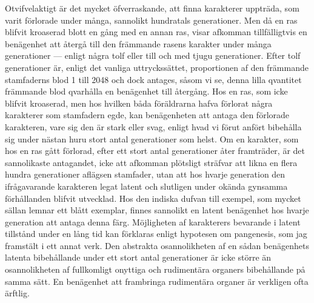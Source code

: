 Otvifvelaktigt är det mycket öfverraskande, att finna karakterer uppträda, som varit förlorade under många, sannolikt hundratals generationer. Men då en ras blifvit kroaserad blott en gång med en annan ras, visar afkomman tillfälligtvis en benägenhet att återgå till den främmande rasens karakter under många generationer — enligt några tolf eller till och med tjugu generationer. Efter tolf generationer är, enligt det vanliga uttryckssättet, proportionen af den främmande stamfaderns blod 1 till 2048 och dock antages, såsom vi se, denna lilla qvantitet främmande blod qvarhålla en benägenhet till återgång. Hos en ras, som icke blifvit kroaserad, men hos hvilken båda föräldrarna hafva förlorat några karakterer som stamfadern egde, kan benägenheten att antaga den förlorade karakteren, vare sig den är stark eller svag, enligt hvad vi förut anfört bibehålla sig under nästan huru stort antal generationer som helst. Om en karakter, som hos en ras gått förlorad, efter ett stort antal generationer åter framträder, är det sannolikaste antagandet, icke att afkomman plötsligt sträfvar att likna en flera hundra generationer aflägsen stamfader, utan att hos hvarje generation den ifrågavarande karakteren legat latent och slutligen under okända gynsamma förhållanden blifvit utvecklad. Hos den indiska dufvan till exempel, som mycket sällan lemnar ett blått exemplar, finnes sannolikt en latent benägenhet hos hvarje generation att antaga denna färg. Möjligheten af karakterers bevarande i latent tillstånd under en lång tid kan förklaras enligt hypotesen om pangenesis, som jag framstält i ett annat verk. Den abstrakta osannolikheten af en sådan benägenhets latenta bibehållande under ett stort antal generationer är icke större än osannolikheten af fullkomligt onyttiga och rudimentära organers bibehållande på samma sätt. En benägenhet att frambringa rudimentära organer är verkligen ofta ärftlig.

